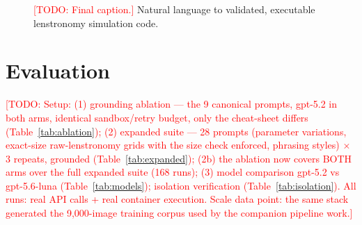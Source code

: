 \documentclass{article}
\newcommand{\todo}[1]{\textcolor{red}{[TODO: #1]}}
\begin{document}
\begin{figure}[t]
  \centering
  \caption{\todo{Final caption.} Natural language to validated, executable
  lenstronomy simulation code.}
  \label{fig:flow}
\end{figure}

\section{Evaluation}
\label{sec:eval}
\todo{Setup: (1) grounding ablation — the 9 canonical prompts, gpt-5.2 in both
arms, identical sandbox/retry budget, only the cheat-sheet differs
(Table~\ref{tab:ablation}); (2) expanded suite — 28 prompts (parameter
variations, exact-size raw-lenstronomy grids with the size check enforced,
phrasing styles) $\times$ 3 repeats, grounded (Table~\ref{tab:expanded});
(2b) the ablation now covers BOTH arms over the full expanded suite (168 runs);
(3) model comparison gpt-5.2 vs gpt-5.6-luna (Table~\ref{tab:models});
isolation verification (Table~\ref{tab:isolation}). All runs: real API calls +
real container execution. Scale data point: the same stack generated the 9{,}000-image training corpus used
by the companion pipeline work.}
\end{document}
